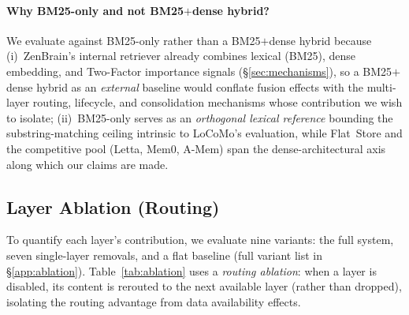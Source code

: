 \documentclass{article}
\begin{document}
\paragraph{Why BM25-only and not BM25$+$dense hybrid?}
We evaluate against BM25-only rather than a BM25$+$dense hybrid
because (i)~ZenBrain's internal retriever already combines lexical
(BM25), dense embedding, and Two-Factor importance signals
(\S\ref{sec:mechanisms}), so a BM25$+$dense hybrid as an
\emph{external} baseline would conflate fusion effects with the
multi-layer routing, lifecycle, and consolidation mechanisms whose
contribution we wish to isolate; (ii)~BM25-only serves as an
\emph{orthogonal lexical reference} bounding the substring-matching
ceiling intrinsic to LoCoMo's evaluation, while Flat~Store and the
competitive pool (Letta, Mem0, A-Mem)
span the dense-architectural axis along which our claims are made.

\subsection{Layer Ablation (Routing)}
\label{app:layer-ablation}

To quantify each layer's contribution, we evaluate nine variants:
the full system, seven single-layer removals, and a flat baseline
(full variant list in \S\ref{app:ablation}).
Table~\ref{tab:ablation} uses a \emph{routing ablation}: when a layer is
disabled, its content is rerouted to the next available layer (rather than
dropped), isolating the routing advantage from data availability effects.
\end{document}
